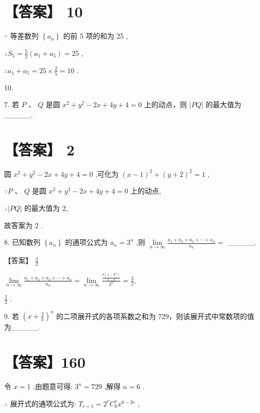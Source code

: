 \documentclass[10pt]{article}
\begin{document}
\section*{【答案】 10}

\(\because\) 等差数列 \(\left\{  {a}_{n}\right\}\) 的前 5 项的和为 25 ,

\(\therefore {S}_{5} = \frac{5}{2}\left( {{a}_{1} + {a}_{5}}\right)  = {25}\) ,

\(\therefore {a}_{1} + {a}_{5} = {25} \times  \frac{2}{5} = {10}\) .

10.

7. 若 \(P\text{ 、 }Q\) 是圆 \({x}^{2} + {y}^{2} - {2x} + {4y} + 4 = 0\) 上的动点，则 \(\left| {PQ}\right|\) 的最大值为\_\_\_\_\_.

\section*{【答案】 2}

圆 \({x}^{2} + {y}^{2} - {2x} + {4y} + 4 = 0\) ,可化为 \({\left( x - 1\right) }^{2} + {\left( y + 2\right) }^{2} = 1\) ,

\(\because P\text{ 、 }Q\) 是圆 \({x}^{2} + {y}^{2} - {2x} + {4y} + 4 = 0\) 上的动点,

\(\therefore \left| {PQ}\right|\) 的最大值为 2,

故答案为 2 .

8. 已知数列 \(\left\{  {a}_{n}\right\}\) 的通项公式为 \({a}_{n} = {3}^{n}\) ,则 \(\mathop{\lim }\limits_{{n \rightarrow  \infty }}\frac{{a}_{1} + {a}_{2} + {a}_{3} + \cdots  + {a}_{n}}{{a}_{n}} =\) \_\_\_\_\_.

【答案】 \(\frac{3}{2}\)

\(\mathop{\lim }\limits_{{n \rightarrow  \infty }}\frac{{a}_{1} + {a}_{2} + {a}_{3} + \cdots  + {a}_{n}}{{a}_{n}} = \mathop{\lim }\limits_{{n \rightarrow  \infty }}\frac{\frac{3\left( {1 - {3}^{n}}\right) }{1 - 3}}{{3}^{n}} = \frac{3}{2},\)

\(\frac{3}{2}\) .

9. 若 \({\left( x + \frac{2}{x}\right) }^{n}\) 的二项展开式的各项系数之和为 729，则该展开式中常数项的值为\_\_\_\_\_.

\section*{【答案】160}

令 \(x = 1\) ,由题意可得: \({3}^{n} = {729}\) ,解得 \(n = 6\) .

\(\therefore\) 展开式的通项公式为: \({T}_{r + 1} = {2}^{r}{C}_{6}^{r}{x}^{6 - {2r}}\) ,
\end{document}
